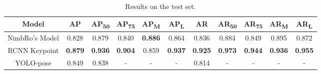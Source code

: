 \begin{table}
  \caption{Results on the test set.}
  \centering
      \begin{tabular}{|c|c|c|c|c|c|c|c|c|c|c|} 
      \hline
      \rowcolor{lightgray} \textbf{Model} & \textbf{AP} & \textbf{AP\textsubscript{50}} & \textbf{AP\textsubscript{75}} & \textbf{AP\textsubscript{M}} & \textbf{AP\textsubscript{L}} & \textbf{AR} & \textbf{AR\textsubscript{50}} & \textbf{AR\textsubscript{75}} & \textbf{AR\textsubscript{M}} & \textbf{AR\textsubscript{L}} \\ 
      \hline
      NimbRo's Model        & 0.828       & 0.879                         & 0.840                         & \textbf{0.886}                         & 0.864                        & 0.836       & 0.884                         & 0.849                         & 0.895                        & 0.872 \\
      \hline
      RCNN Keypoint           & \textbf{0.879}       & \textbf{0.936}                         & \textbf{0.904}                         & 0.859                        & \textbf{0.937}                       & \textbf{0.925}       & \textbf{0.973}                         & \textbf{0.944}                         & \textbf{0.936}                        & \textbf{0.955} \\
      \hline
      YOLO-pose           & 0.849       & 0.838                         & -                             & -                            & -                            & 0.814       & -                             & -                             & -                            & - \\
      \hline
      \end{tabular}
      \label{tb:result-on-test-set}\\
  \end{table}


